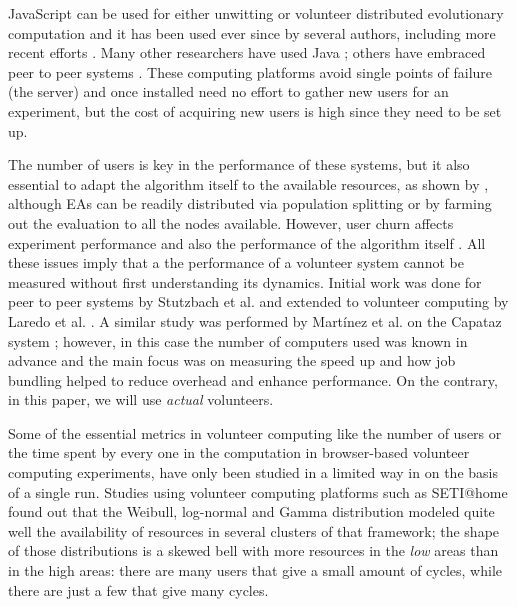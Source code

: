 \documentclass[letterpaper]{article}
\begin{document}
JavaScript can be used for either unwitting
\citep{unwitting-ec,boldrin2007distributed} or volunteer
\citep{langdon:2005:metas,gecco07:workshop:dcor} distributed
evolutionary computation and it has been used ever since by several
authors, including more recent efforts
\citep{Desell:2008:AHG:1389095.1389273,duda2013distributed,DBLP:journals/corr/abs-0801-1210}. Many
other researchers have used Java \citep{chong:1999:jDGPi}; others have
embraced peer to peer systems
\citep{jin2006constructing,10.1109/ICICSE.2008.99,DBLP:conf/3pgcic/GuervosMFEL12}. These
computing platforms avoid single points of failure (the server) and
once installed need no effort to gather new users for an experiment,
but the cost of acquiring new users is high since they need to be set
up.

The number of users is key in the performance of these systems, but it
also essential to adapt
the algorithm itself to the available resources, as shown by
\citep{milani2004online}, although EAs can be readily distributed via
population splitting or by farming out the evaluation to all 
the nodes available. However, user churn affects experiment performance 
\citep{gonzalez2010characterizing,nogueras2015studying} and also the
performance of the algorithm itself
\citep{DBLP:journals/gpem/LaredoBGVAGF14}. All these issues imply that
a the performance of a volunteer system cannot be
measured without first understanding its dynamics. Initial
work was done for peer to peer systems by Stutzbach et
al. \citep{stutzbach2006understanding} and extended to volunteer
computing by Laredo et al. \citep{churn08,laredo2008rcp}. A similar
study was performed by Martínez et al. on the Capataz system
\citep{martinez2015capataz}; however, in this case the number of
computers used was known in advance and the main focus was on
measuring the speed up and how job bundling helped to reduce overhead and
enhance performance. On the contrary, in this paper, we will use {\em
  actual} volunteers.

Some of the essential metrics in volunteer computing like the
number of users or the time spent by every one in the
computation in browser-based volunteer computing experiments, have
only been studied in a limited way in 
\citep{DBLP:journals/gpem/LaredoBGVAGF14} on the basis of a single
run. Studies using volunteer computing platforms such as SETI@home
\citep{javadi2009mining,agajaj} found out that the Weibull, log-normal and
Gamma distribution 
modeled quite well the availability of resources in several clusters
of that framework; the shape of those distributions is a skewed bell
with more resources in the {\em low} areas than in the high areas:
there are many users that give a small amount of cycles, while there
are just a few that give many cycles. 
\end{document}
